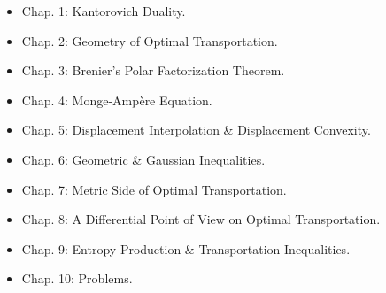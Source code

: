 \documentclass{article}
\begin{document}
\begin{enumerate}
\begin{itemize}
		\item {\sf Chap. 1: Kantorovich Duality.}
		\item {\sf Chap. 2: Geometry of Optimal Transportation.}
		\item {\sf Chap. 3: Brenier's Polar Factorization Theorem.}
		\item {\sf Chap. 4: Monge-Amp\`ere Equation.}
		\item {\sf Chap. 5: Displacement Interpolation \& Displacement Convexity.}
		\item {\sf Chap. 6: Geometric \& Gaussian Inequalities.}
		\item {\sf Chap. 7: Metric Side of Optimal Transportation.}
		\item {\sf Chap. 8: A Differential Point of View on Optimal Transportation.}
		\item {\sf Chap. 9: Entropy Production \& Transportation Inequalities.}
		\item {\sf Chap. 10: Problems.}
	\end{itemize}
\end{enumerate}


\end{document}
